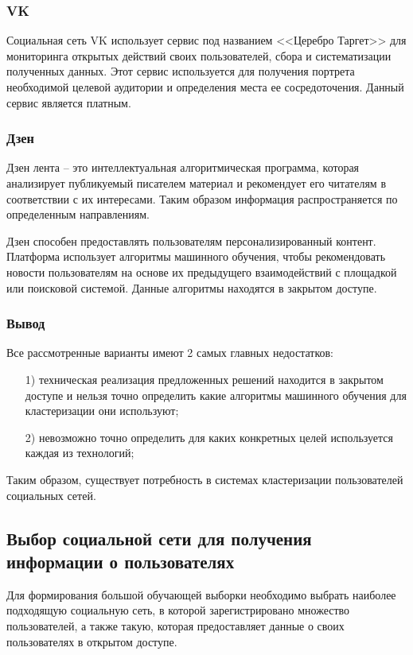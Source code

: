 \subsubsection{VK}
Социальная сеть VK использует сервис под названием <<Церебро Таргет>> для мониторинга открытых действий своих пользователей, сбора и систематизации полученных данных. Этот сервис используется для получения портрета необходимой целевой аудитории и определения места ее сосредоточения. Данный сервис является платным.

\subsubsection{Дзен}
Дзен лента – это интеллектуальная алгоритмическая программа, которая анализирует публикуемый писателем материал и рекомендует его читателям в соответствии с их интересами. Таким образом информация распространяется по определенным направлениям. 

Дзен способен предоставлять пользователям персонализированный контент.  Платформа использует алгоритмы машинного обучения, чтобы рекомендовать новости пользователям на основе их предыдущего взаимодействий с площадкой или поисковой системой. Данные алгоритмы находятся в закрытом доступе.

\subsubsection{Вывод}
Все рассмотренные варианты имеют 2 самых главных недостатков:
\begin{enumerate}
	\item[1)] техническая реализация предложенных решений находится в закрытом доступе и нельзя точно определить какие алгоритмы машинного обучения для кластеризации они используют;
	\item[2)] невозможно точно определить для каких конкретных целей используется каждая из технологий;
\end{enumerate}

Таким образом, существует потребность в системах кластеризации пользователей социальных сетей.

\subsection{Выбор социальной сети для получения информации о пользователях}
Для формирования большой обучающей выборки необходимо выбрать наиболее подходящую социальную сеть, в которой зарегистрировано множество пользователей, а также такую, которая предоставляет данные о своих пользователях в открытом доступе.

